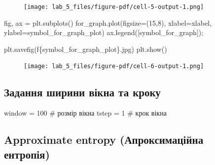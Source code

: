 \documentclass[
  letterpaper,
]{report}
\newenvironment{Shaded}{\begin{snugshade}}{\end{snugshade}}
\newcommand{\CommentTok}[1]{\textcolor[rgb]{0.37,0.37,0.37}{#1}}
\newcommand{\DecValTok}[1]{\textcolor[rgb]{0.68,0.00,0.00}{#1}}
\newcommand{\NormalTok}[1]{\textcolor[rgb]{0.00,0.23,0.31}{#1}}
\newcommand{\OperatorTok}[1]{\textcolor[rgb]{0.37,0.37,0.37}{#1}}
\newcommand{\SpecialCharTok}[1]{\textcolor[rgb]{0.37,0.37,0.37}{#1}}
\newcommand{\SpecialStringTok}[1]{\textcolor[rgb]{0.13,0.47,0.30}{#1}}
\begin{document}
\begin{figure}[H]

{\centering \texttt{[image: lab\_5\_files/figure-pdf/cell-5-output-1.png]}

}

\end{figure}

\begin{Shaded}
\begin{Highlighting}[]
\NormalTok{fig, ax }\OperatorTok{=}\NormalTok{ plt.subplots()}
\NormalTok{for\_graph.plot(figsize}\OperatorTok{=}\NormalTok{(}\DecValTok{15}\NormalTok{,}\DecValTok{8}\NormalTok{), xlabel}\OperatorTok{=}\NormalTok{xlabel, ylabel}\OperatorTok{=}\NormalTok{symbol\_for\_graph\_plot)}
\NormalTok{ax.legend([symbol\_for\_graph])}\OperatorTok{;}

\NormalTok{plt.savefig(}\SpecialStringTok{f\textquotesingle{}}\SpecialCharTok{\{}\NormalTok{symbol\_for\_graph\_plot}\SpecialCharTok{\}}\SpecialStringTok{.jpg\textquotesingle{}}\NormalTok{)}
\NormalTok{plt.show()}
\end{Highlighting}
\end{Shaded}

\begin{figure}[H]

{\centering \texttt{[image: lab\_5\_files/figure-pdf/cell-6-output-1.png]}

}

\end{figure}

\hypertarget{ux437ux430ux434ux430ux43dux43dux44f-ux448ux438ux440ux438ux43dux438-ux432ux456ux43aux43dux430-ux442ux430-ux43aux440ux43eux43aux443}{%
\subsection{Задання ширини вікна та
кроку}\label{ux437ux430ux434ux430ux43dux43dux44f-ux448ux438ux440ux438ux43dux438-ux432ux456ux43aux43dux430-ux442ux430-ux43aux440ux43eux43aux443}}

\begin{Shaded}
\begin{Highlighting}[]
\NormalTok{window }\OperatorTok{=} \DecValTok{100} \CommentTok{\# розмір вікна}
\NormalTok{tstep }\OperatorTok{=} \DecValTok{1} \CommentTok{\# крок вікна }
\end{Highlighting}
\end{Shaded}

\hypertarget{approximate-entropy-ux430ux43fux440ux43eux43aux441ux438ux43cux430ux446ux456ux439ux43dux430-ux435ux43dux442ux440ux43eux43fux456ux44f}{%
\subsection{Approximate entropy (Апроксимаційна
ентропія)}\label{approximate-entropy-ux430ux43fux440ux43eux43aux441ux438ux43cux430ux446ux456ux439ux43dux430-ux435ux43dux442ux440ux43eux43fux456ux44f}}
\end{document}
